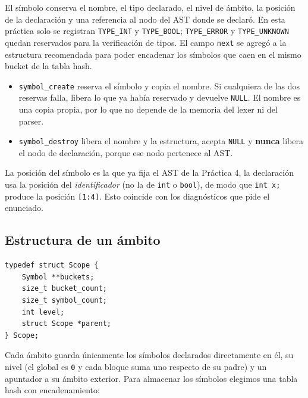 \documentclass[12pt,letterpaper]{article}
\begin{document}
\bigskip

El símbolo conserva el nombre, el tipo declarado, el nivel de ámbito, la posición de la declaración y una
referencia al nodo del AST donde se declaró. En esta práctica solo se registran \texttt{TYPE\_INT} y
\texttt{TYPE\_BOOL}; \texttt{TYPE\_ERROR} y \texttt{TYPE\_UNKNOWN} quedan reservados para la verificación de
tipos. El campo \texttt{next} se agregó a la estructura recomendada para poder encadenar los símbolos que
caen en el mismo bucket de la tabla hash.

\begin{itemize}
\item \texttt{symbol\_create} reserva el símbolo y copia el nombre. Si cualquiera de las dos reservas falla,
  libera lo que ya había reservado y devuelve \texttt{NULL}. El nombre es una copia propia, por lo que no
  depende de la memoria del lexer ni del parser.
  
\item \texttt{symbol\_destroy} libera el nombre y la estructura, acepta \texttt{NULL} y \textbf{nunca} libera
  el nodo de declaración, porque ese nodo pertenece al AST.
\end{itemize}

La posición del símbolo es la que ya fija el AST de la Práctica 4, la declaración usa la posición del
\emph{identificador} (no la de \texttt{int} o \texttt{bool}), de modo que \texttt{int x;} produce la posición
\texttt{[1:4]}. Esto coincide con los diagnósticos que pide el enunciado.

\subsection*{Estructura de un ámbito}

\begin{lstlisting}[style=modernc, caption={Estructura \texttt{Scope} de \texttt{scope.h}.}]
typedef struct Scope {
    Symbol **buckets;
    size_t bucket_count;
    size_t symbol_count;
    int level;
    struct Scope *parent;
} Scope;
\end{lstlisting}

\bigskip

Cada ámbito guarda únicamente los símbolos declarados directamente en él, su nivel (el global es \texttt{0} y
cada bloque suma uno respecto de su padre) y un apuntador a su ámbito exterior. Para almacenar los símbolos
elegimos una tabla hash con encadenamiento:
\end{document}
